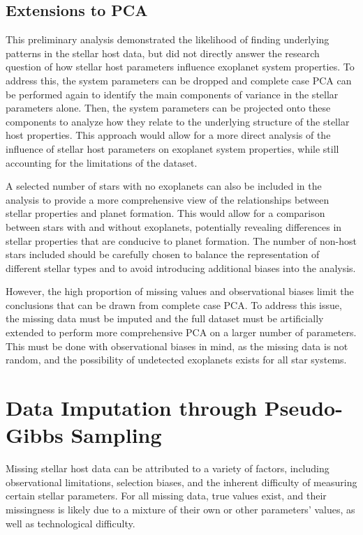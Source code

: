 \documentclass[preprint]{aastex631}
\begin{document}
\subsection{Extensions to PCA}

This preliminary analysis demonstrated the likelihood of finding underlying patterns in the stellar host data, but did not directly answer the research question of how stellar host parameters influence exoplanet system properties. To address this, the system parameters can be dropped and complete case PCA can be performed again to identify the main components of variance in the stellar parameters alone. Then, the system parameters can be projected onto these components to analyze how they relate to the underlying structure of the stellar host properties. This approach would allow for a more direct analysis of the influence of stellar host parameters on exoplanet system properties, while still accounting for the limitations of the dataset.

A selected number of stars with no exoplanets can also be included in the analysis to provide a more comprehensive view of the relationships between stellar properties and planet formation. This would allow for a comparison between stars with and without exoplanets, potentially revealing differences in stellar properties that are conducive to planet formation. The number of non-host stars included should be carefully chosen to balance the representation of different stellar types and to avoid introducing additional biases into the analysis.

However, the high proportion of missing values and observational biases limit the conclusions that can be drawn from complete case PCA. To address this issue, the missing data must be imputed and the full dataset must be artificially extended to perform more comprehensive PCA on a larger number of parameters. This must be done with observational biases in mind, as the missing data is not random, and the possibility of undetected exoplanets exists for all star systems.

\section{Data Imputation through Pseudo-Gibbs Sampling}

Missing stellar host data can be attributed to a variety of factors, including observational limitations, selection biases, and the inherent difficulty of measuring certain stellar parameters. For all missing data, true values exist, and their missingness is likely due to a mixture of their own or other parameters' values, as well as technological difficulty.
\end{document}
